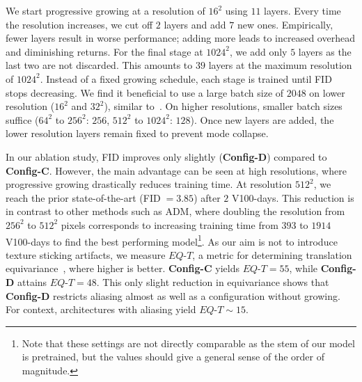 We start progressive growing at a resolution of $16^2$ using $11$ layers. Every time the resolution increases, we cut off $2$ layers and add $7$ new ones. Empirically, fewer layers result in worse performance; adding more leads to increased overhead and diminishing returns. For the final stage at $1024^2$, we add only $5$ layers as the last two are not discarded. This amounts to $39$ layers at the maximum resolution of $1024^2$. Instead of a fixed growing schedule, each stage is trained until FID stops decreasing. We find it beneficial to use a large batch size of $2048$ on lower resolution ($16^2$ and $32^2$), similar to~\cite{Brock2019ICLR}. On higher resolutions, smaller batch sizes suffice ($64^2$ to $256^2$: $256$, $512^2$ to $1024^2$: $128$). Once new layers are added, the lower resolution layers remain fixed to prevent mode collapse. 

In our ablation study, FID improves only slightly (\textbf{Config-D}) compared to \textbf{Config-C}. However, the main advantage can be seen at high resolutions, where progressive growing drastically reduces training time. At resolution $512^2$, we reach the prior state-of-the-art (FID$\;=3.85$) after $2$ V100-days.  This reduction is in contrast to other methods such as ADM, where doubling the resolution from $256^2$ to $512^2$ pixels corresponds to increasing training time from $393$ to $1914$ V100-days to find the best performing model\footnote{Note that these settings are not directly comparable as the stem of our model is pretrained, but the values should give a general sense of the order of magnitude.}. As our aim is not to introduce texture sticking artifacts, we measure $EQ\text{-}T$, a metric for determining translation equivariance~\cite{Karras2021NEURIPS}, where higher is better. 
\textbf{Config-C} yields $EQ\text{-}T=55$, while \textbf{Config-D} attains $EQ\text{-}T=48$.
This only slight reduction in equivariance shows that \textbf{Config-D} restricts aliasing almost as well as a configuration without growing. For context, architectures with aliasing yield $EQ\text{-}T\sim 15$.


